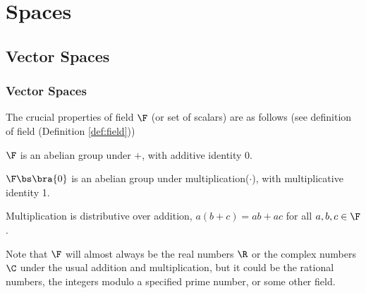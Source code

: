 
\chapter{Spaces}

\section{Vector Spaces}\label{sec:vector_space}

\subsection{Vector Spaces}%

The crucial properties of field $\F$ (or set of scalars) are as follows (see definition of field (Definition \ref{def:field}))
\ben
\item [(i)] $\F$ is an abelian group under $+$, with additive identity 0.
\item [(ii)] $\F\bs \bra{0}$ is an abelian group under multiplication($\cdot$), with multiplicative identity 1.
\item [(iii)] Multiplication is distributive over addition, $a(b + c) = ab + ac$ for all $a, b, c \in \F$.
\een

\begin{remark}
Note that $\F$ will almost always be the real numbers $\R$ or the complex numbers $\C$ under the usual addition and multiplication, but it could be the rational numbers, the integers modulo a specified prime number, or some other field.
\end{remark}

